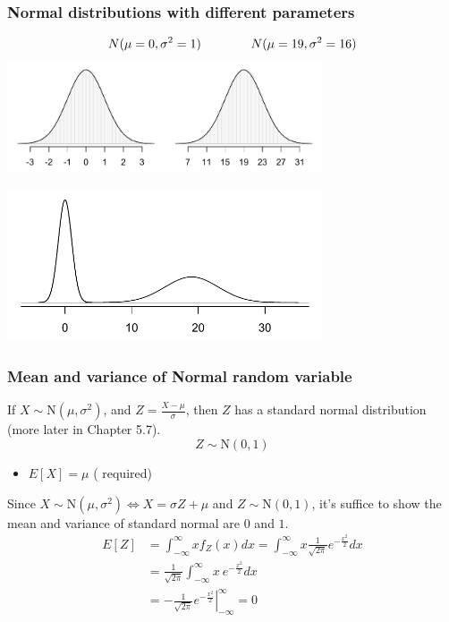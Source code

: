 \documentclass[slidestop,compress,mathserif]{beamer}
\begin{document}
\begin{frame}
\frametitle{Normal distributions with different parameters}

\vspace{-1cm}
\begin{center}
\[N(\mu = 0, \sigma^2 = 1) \hspace{1.4cm} N(\mu = 19, \sigma^2 = 16) \]
\includegraphics[width=0.7\textwidth]{figures/twoSampleNormals}
\end{center}

\begin{center}
\includegraphics[width=0.7\textwidth]{figures/twoSampleNormalsStacked}
\end{center}

\end{frame}

\begin{frame}\frametitle{Mean and variance of Normal random variable}
If $X \sim \text{N}(\mu, \sigma^2)$, and $Z = \frac{X - \mu}{\sigma}$, then $Z$ has a standard normal distribution (more later in Chapter 5.7).
\[ Z \sim \text{N}(0, 1) \]
\pause

\begin{itemize}
\item $E[X] = \mu$ ({\color{red} required})
\end{itemize}
\pause


\hspace{0.5cm}
Since $X \sim \text{N}(\mu, \sigma^2) \Longleftrightarrow X = \sigma Z + \mu$ and $Z \sim \text{N}(0, 1)$,
it's suffice to show the mean and variance of standard normal are $0$ and $1$.
\pause
{\footnotesize{
\begin{align*}
E[Z] & = \int_{-\infty}^{\infty} x f_Z(x) dx = \int_{-\infty}^{\infty} x \frac{1}{\sqrt{2\pi}} e^{-\frac{x^2}{2}}dx\\
& = \frac{1}{\sqrt{2\pi}}\int_{-\infty}^{\infty} x~e^{-\frac{x^2}{2}}dx\\
& = -\frac{1}{\sqrt{2\pi}}\left. e^{-\frac{x^2}{2}}\right|_{-\infty}^{\infty} = 0
\end{align*}
}}

\end{frame}
\end{document}
